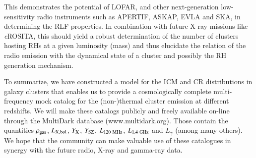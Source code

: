 \documentclass[useAMS,usenatbib]{mn2e}
\begin{document}
This demonstrates the potential of LOFAR, and other next-generation
low-sensitivity radio instruments such as APERTIF, ASKAP, EVLA and SKA, in
determining the RLF properties. In combination with future X-ray missions like
\emph{e}ROSITA, this should yield a robust determination of the number of
clusters hosting RHs at a given luminosity (mass) and thus elucidate the
relation of the radio emission with the dynamical state of a cluster and
possibly the RH generation mechanism.

To summarize, we have constructed a model for the ICM and CR distributions in
galaxy clusters that enables us to provide a cosmologically complete
multi-frequency mock catalog for the \mbox{(non-)thermal} cluster emission at different
redshifts. We will make these catalogs publicly and freely available on-line
through the MultiDark database (www.multidark.org). Those contain the quantities
$\rho_{{\mathrm{gas}}}$, $L_{{\mathrm{X, bol}}}$, $Y_{{\mathrm{X}}}$, $Y_{{\mathrm{SZ}}}$,
$L_{120~{\mathrm{MHz}}}$, $L_{1.4~{\mathrm{GHz}}}$ and $L_{\gamma}$ (among many
others). We hope that the community can make valuable use of these catalogues in
synergy with the future radio, X-ray and gamma-ray data.


\end{document}
